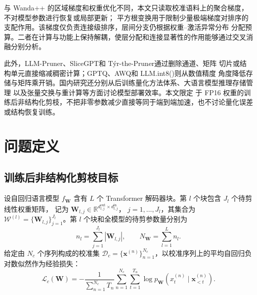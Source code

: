 \documentclass[UTF8,fontset=fandol]{ctexart}
\begin{document}
与 Wanda++ 的区域梯度和权重优化不同，本文只读取校准语料上的聚合梯度，不对模型参数进行恢复或局部更新；
平方根变换用于限制少量极端梯度对排序的支配作用。该梯度仅负责连接级排序，层间分支仍根据权重--激活异常分布
分配预算。二者在计算与功能上保持解耦，使层分配和连接显著性的作用能够通过交叉消融分别分析。

此外，LLM-Pruner\cite{llmpruner}、SliceGPT\cite{slicegpt}和 T\'yr-the-Pruner\cite{tyr}通过删除通道、矩阵
切片或结构单元直接缩减稠密计算；GPTQ\cite{gptq}、AWQ\cite{awq}和 LLM.int8()\cite{llmint8}则从数值精度
角度降低存储与矩阵乘开销。国内研究还分别从后训练量化方法体系\cite{zhang2026ptq}、大语言模型推理存储管理
\cite{ge2025storage}以及张量交换与重计算\cite{liang2025adaptive}等方面讨论模型部署效率。本文限定
于 FP16 权重的训练后非结构化剪枝，不把非零参数减少直接等同于端到端加速，也不讨论量化误差或结构恢复训练。

\section{问题定义}

\subsection{训练后非结构化剪枝目标}

设自回归语言模型 $f_{\bm W}$ 含有 $L$ 个 Transformer 解码器块。第 $l$ 个块包含 $J_l$ 个待剪线性权重矩阵，
记为
$\bm W_{l,j}\in\mathbb R^{d_{l,j}^{\mathrm{out}}\times d_{l,j}^{\mathrm{in}}}$，
$j=1,\ldots,J_l$，其集合为
$\mathcal W^{(l)}=\{\bm W_{l,j}\}_{j=1}^{J_l}$。第 $l$ 个块和全模型的待剪参数量分别为
\begin{equation}
n_l=\sum_{j=1}^{J_l}\left|\bm W_{l,j}\right|,
\qquad
N_{\bm W}=\sum_{l=1}^{L}n_l .
\label{eq:parameter_count}
\end{equation}
给定由 $N_c$ 个序列构成的校准集
$\mathcal D_c=\{\bm x^{(n)}\}_{n=1}^{N_c}$，以校准序列上的平均自回归负对数似然作为经验损失：
\begin{equation}
\mathcal L_c(\bm W)
=
-\frac{1}{\sum_{n=1}^{N_c}T_n}
\sum_{n=1}^{N_c}\sum_{t=1}^{T_n}
\log p_{\bm W}\!\left(x_t^{(n)}\mid \bm x_{<t}^{(n)}\right).
\label{eq:calibration_loss}
\end{equation}
\end{document}
